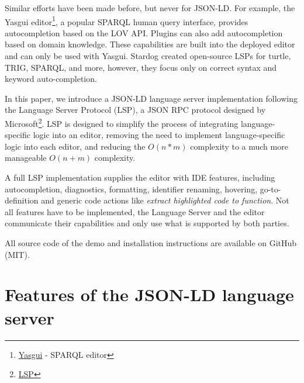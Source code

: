 \documentclass[
]{ceurart}
\begin{document}
Similar efforts have been made before, but never for JSON-LD. 
For example, the Yasgui editor\footnote{\href{https://triply.cc/docs/yasgui/}{Yasgui} - SPARQL editor}, a popular SPARQL human query interface, provides autocompletion based on the LOV API\cite{LOV}. 
Plugins can also add autocompletion based on domain knowledge. 
These capabilities are built into the deployed editor and can only be used with Yasgui.
Stardog created open-source LSPs for turtle, TRIG, SPARQL, and more, however, they focus only on correct syntax and keyword auto-completion\cite{stardog}. 

In this paper, we introduce a JSON-LD language server implementation following the Language Server Protocol (LSP), a JSON RPC protocol designed by Microsoft\footnote{\href{https://microsoft.github.io/language-server-protocol/}{LSP}}.
LSP is designed to simplify the process of integrating language-specific logic into an editor, removing the need to implement language-specific logic into each editor, and reducing the \(O(n*m)\) complexity to a much more manageable \(O(n+m)\) complexity\cite{LSP-Multi}.

A full LSP implementation supplies the editor with IDE features, including autocompletion, diagnostics, formatting, identifier renaming, hovering, go-to-definition and generic code actions like \textit{extract highlighted code to function}. 
Not all features have to be implemented, the Language Server and the editor communicate their capabilities and only use what is supported by both parties.

All source code of the demo and installation instructions are available on GitHub (MIT).


\section{Features of the JSON-LD language server}

\end{document}
